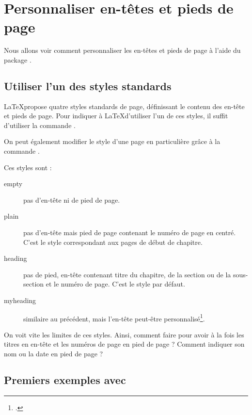 \chapter{Personnaliser en-têtes et pieds de page}\label{entete}

\begin{intro}
Nous allons voir comment personnaliser les en-têtes et pieds de page à l'aide du package .
\end{intro}


\section{Utiliser l'un des styles standards}\label{stylesentete}

\LaTeX propose quatre styles standards de page, définissant le contenu des en-tête et pieds de page. Pour indiquer à \LaTeX d'utiliser l'un de ces styles, il suffit d'utiliser la commande .


On peut également modifier le style d'une page en particulière grâce à la commande .

Ces styles sont :
\begin{description}
\item[empty] pas d'en-tête ni de pied de page.
\item[plain] pas d'en-tête mais pied de page contenant le numéro de page en centré. C'est le style correspondant aux pages de début de chapitre. 
\item[heading] pas de pied, en-tête contenant titre du chapitre, de la section ou de la sous-section et le numéro de page. C'est le style par défaut. \label{styleentetes}
\item[myheading] similaire au précédent, mais l'en-tête peut-être personnalisé\footcite[Nous tenons cette information du][\pno~222, qui ne précise pas comment faire]{latex_companion}.
\end{description}



On voit vite les limites de ces styles. Ainsi, comment faire pour avoir à la fois les titres en en-tête et les numéros de page en pied de page ? Comment indiquer son nom ou la date en pied de page ?

\section{Premiers exemples avec }

